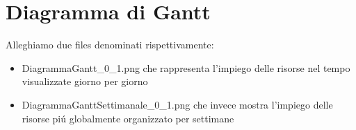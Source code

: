\documentclass[11pt,titlepage,a4paper]{report}
\begin{document}
\chapter{Diagramma di Gantt}
Alleghiamo due files denominati rispettivamente:
\begin {itemize} 
\item DiagrammaGantt\_0\_1.png che rappresenta l'impiego delle risorse nel tempo 
visualizzate giorno per giorno
\item DiagrammaGanttSettimanale\_0\_1.png che invece mostra l'impiego delle risorse
pi\'u globalmente organizzato per settimane
\end{itemize}
\end{document}
